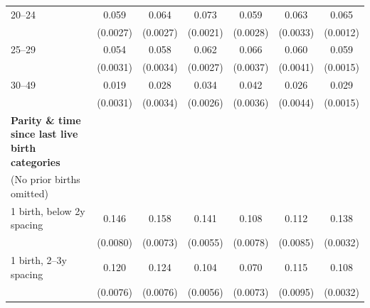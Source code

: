 {\begin{tabular}{l*{6}{c}}
\addlinespace
\hspace*{1em}20–24               &       0.059\sym{***}&       0.064\sym{***}&       0.073\sym{***}&       0.059\sym{***}&       0.063\sym{***}&       0.065\sym{***}\\
                    &    (0.0027)         &    (0.0027)         &    (0.0021)         &    (0.0028)         &    (0.0033)         &    (0.0012)         \\
\addlinespace
\hspace*{1em}25–29               &       0.054\sym{***}&       0.058\sym{***}&       0.062\sym{***}&       0.066\sym{***}&       0.060\sym{***}&       0.059\sym{***}\\
                    &    (0.0031)         &    (0.0034)         &    (0.0027)         &    (0.0037)         &    (0.0041)         &    (0.0015)         \\
\addlinespace
\hspace*{1em}30–49               &       0.019\sym{***}&       0.028\sym{***}&       0.034\sym{***}&       0.042\sym{***}&       0.026\sym{***}&       0.029\sym{***}\\
                    &    (0.0031)         &    (0.0034)         &    (0.0026)         &    (0.0036)         &    (0.0044)         &    (0.0015)         \\
\addlinespace
\textbf{Parity \& time since last live birth categories} \\ (No prior births omitted)&                     &                     &                     &                     &                     &                     \\
\addlinespace
\hspace*{1em}1 birth, below 2y spacing&       0.146\sym{***}&       0.158\sym{***}&       0.141\sym{***}&       0.108\sym{***}&       0.112\sym{***}&       0.138\sym{***}\\
                    &    (0.0080)         &    (0.0073)         &    (0.0055)         &    (0.0078)         &    (0.0085)         &    (0.0032)         \\
\addlinespace
\hspace*{1em}1 birth, 2–3y spacing&       0.120\sym{***}&       0.124\sym{***}&       0.104\sym{***}&       0.070\sym{***}&       0.115\sym{***}&       0.108\sym{***}\\
                    &    (0.0076)         &    (0.0076)         &    (0.0056)         &    (0.0073)         &    (0.0095)         &    (0.0032)         \\

\end{tabular}}
